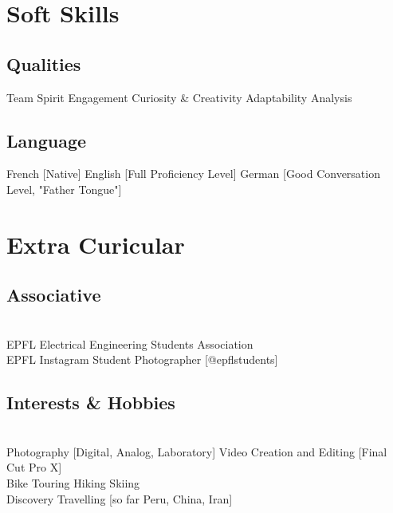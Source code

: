 \documentclass{article}
\newcommand{\descript}[1]{\color{darkgray}\normalfont \textbf{#1\\}}
\newcommand{\longdescript}[1]{\color{subheadings}\normalfont\small {#1\\}}
\newcommand{\sectionsep}[0]{\vspace{-6pt}}
\newcommand{\mybullet}[1]{ \hspace{2pt}\textbullet{#1}\hspace{2pt} }
\begin{document}
\section{Soft Skills}
\subsection{Qualities}
\longdescript{Team Spirit \mybullet{} Engagement \mybullet{} Curiosity \& Creativity\mybullet{} Adaptability \mybullet{}  Analysis     }
\sectionsep
\subsection{Language}
\longdescript{French [Native] \mybullet{} English [Full Proficiency Level] \mybullet{} German [Good Conversation Level, "Father Tongue"]}
\sectionsep

\section{Extra Curicular}
\subsection{Associative}
\descript{}
\longdescript{EPFL Electrical Engineering Students Association \\ EPFL Instagram Student Photographer [@epflstudents] }
\sectionsep
\subsection{Interests \& Hobbies}
\descript{}
\longdescript{Photography [Digital, Analog, Laboratory] \mybullet{}  Video Creation and Editing [Final Cut Pro X]  \\ 
Bike Touring \mybullet{} Hiking \mybullet{} Skiing \\
Discovery Travelling [so far Peru, China, Iran]
} 
\sectionsep
\end{document}
